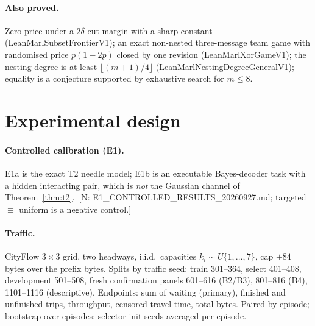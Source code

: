 \documentclass[11pt]{article}
\theoremstyle{definition}
\newcommand{\lean}[1]{\textsf{\footnotesize #1}}
\newif\ifshownotes\shownotestrue
\newcommand{\NOTE}[1]{\ifshownotes{\color{notecol}\,\textsf{\footnotesize[N: #1]}}\fi}
\begin{document}
\paragraph{Also proved.} Zero price under a $2\delta$ cut margin with a sharp constant
(\lean{LeanMarlSubsetFrontierV1}); an exact non-nested three-message team game with randomised
price $p(1-2p)$ closed by one revision (\lean{LeanMarlXorGameV1}); the nesting degree is at least
$\lfloor (m+1)/4\rfloor$ (\lean{LeanMarlNestingDegreeGeneralV1}); equality is a conjecture supported
by exhaustive search for $m\le 8$.

\section{Experimental design}
\paragraph{Controlled calibration (E1).} E1a is the exact T2 needle model; E1b is an executable
Bayes-decoder task with a hidden interacting pair, which is \emph{not} the Gaussian channel of
Theorem~\ref{thm:t2}. \NOTE{E1\_CONTROLLED\_RESULTS\_20260927.md; targeted $\equiv$ uniform is a
negative control.}
\paragraph{Traffic.} CityFlow $3\times3$ grid, two headways, i.i.d.\ capacities
$k_i\sim U\{1,\dots,7\}$, cap $+84$ bytes over the prefix bytes. Splits by traffic seed: train
301--364, select 401--408, development 501--508, fresh confirmation panels 601--616 (B2/B3),
801--816 (B4), 1101--1116 (descriptive). Endpoints: sum of waiting (primary), finished and
unfinished trips, throughput, censored travel time, total bytes. Paired by episode; bootstrap over
episodes; selector init seeds averaged per episode.
\end{document}
